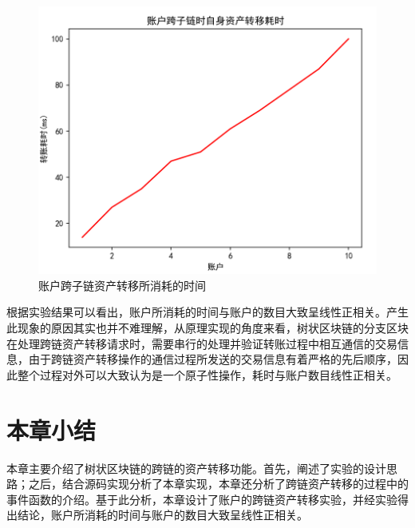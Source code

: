\begin{figure}
	\centering
	\includegraphics[width=\textwidth]{figures/账户跨子链资产转移所消耗的时间.png}
	\caption{账户跨子链资产转移所消耗的时间}
	\label{fig:账户跨子链资产转移所消耗的时间}
\end{figure}

根据实验结果可以看出，账户所消耗的时间与账户的数目大致呈线性正相关。产生此现象的原因其实也并不难理解，从原理实现的角度来看，树状区块链的分支区块在处理跨链资产转移请求时，需要串行的处理并验证转账过程中相互通信的交易信息，由于跨链资产转移操作的通信过程所发送的交易信息有着严格的先后顺序，因此整个过程对外可以大致认为是一个原子性操作，耗时与账户数目线性正相关。

\section{本章小结}

本章主要介绍了树状区块链的跨链的资产转移功能。首先，阐述了实验的设计思路；之后，结合源码实现分析了本章实现，本章还分析了跨链资产转移的过程中的事件函数的介绍。基于此分析，本章设计了账户的跨链资产转移实验，并经实验得出结论，账户所消耗的时间与账户的数目大致呈线性正相关。


